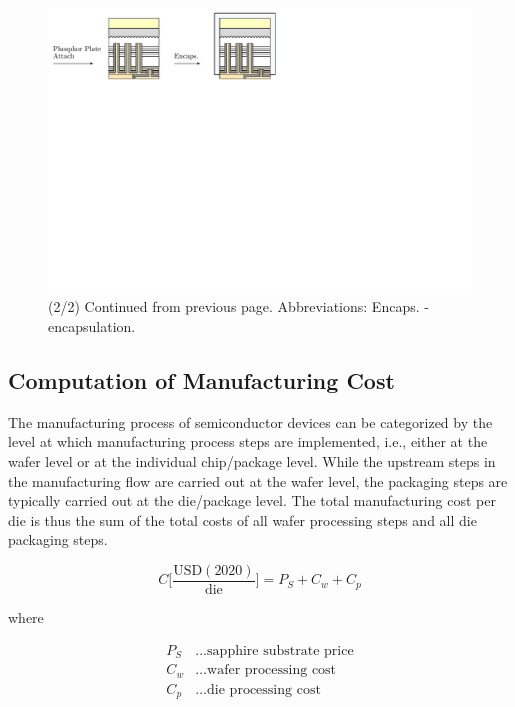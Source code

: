 \documentclass[10pt]{article}
\begin{document}
    \begin{landscape}
        \begin{figure}
            \includegraphics[width=595pt]{./figures/csp_overview_2020-2.pdf}
            \caption{(2/2) Continued from previous page. Abbreviations: Encaps. - encapsulation.}
            \label{fig:manuf_csp_2020-2}
        \end{figure}
    \end{landscape}

\subsection{Computation of Manufacturing Cost}

The manufacturing process of semiconductor devices can be categorized by the level at which manufacturing process steps are implemented, i.e., either at the wafer level or at the individual chip/package level. While the upstream steps in the manufacturing flow are carried out at the wafer level, the packaging steps are typically carried out at the die/package level. The total manufacturing cost per die is thus the sum of the total costs of all wafer processing steps and all die packaging steps.

\begin{equation}
\label{eqn:cost_sum}
    C \bigg[ \frac{ \text{USD}(2020) }{ \text{die} } \bigg] = P_S + C_w + C_p
\end{equation}

where

\begin{align*}
    P_S &\dots \text{sapphire substrate price} \\
    C_w &\dots \text{wafer processing cost} \\
    C_p &\dots \text{die processing cost}
\end{align*}
\end{document}

